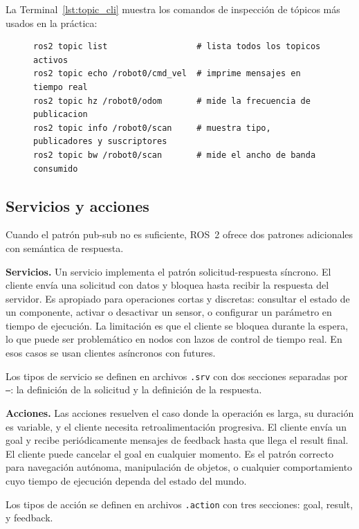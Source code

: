 La Terminal~\ref{lst:topic_cli} muestra los comandos de inspección de tópicos más usados en la práctica:

\begin{figure}[H]
\centering
\begin{lstlisting}[style=bash, caption={Herramientas de línea de comandos para inspección de tópicos.}, label={lst:topic_cli}]
ros2 topic list                  # lista todos los topicos activos
ros2 topic echo /robot0/cmd_vel  # imprime mensajes en tiempo real
ros2 topic hz /robot0/odom       # mide la frecuencia de publicacion
ros2 topic info /robot0/scan     # muestra tipo, publicadores y suscriptores
ros2 topic bw /robot0/scan       # mide el ancho de banda consumido
\end{lstlisting}
\end{figure}

\subsection{Servicios y acciones}

Cuando el patrón pub-sub no es suficiente, ROS~2 ofrece dos patrones adicionales con semántica de respuesta.

\textbf{Servicios.} Un servicio implementa el patrón solicitud-respuesta síncrono. El cliente envía una solicitud con datos y bloquea hasta recibir la respuesta del servidor. Es apropiado para operaciones cortas y discretas: consultar el estado de un componente, activar o desactivar un sensor, o configurar un parámetro en tiempo de ejecución. La limitación es que el cliente se bloquea durante la espera, lo que puede ser problemático en nodos con lazos de control de tiempo real. En esos casos se usan clientes asíncronos con futures.

Los tipos de servicio se definen en archivos \texttt{.srv} con dos secciones separadas por \texttt{---}: la definición de la solicitud y la definición de la respuesta.

\textbf{Acciones.} Las acciones resuelven el caso donde la operación es larga, su duración es variable, y el cliente necesita retroalimentación progresiva. El cliente envía un goal y recibe periódicamente mensajes de feedback hasta que llega el result final. El cliente puede cancelar el goal en cualquier momento. Es el patrón correcto para navegación autónoma, manipulación de objetos, o cualquier comportamiento cuyo tiempo de ejecución dependa del estado del mundo.

Los tipos de acción se definen en archivos \texttt{.action} con tres secciones: goal, result, y feedback.

